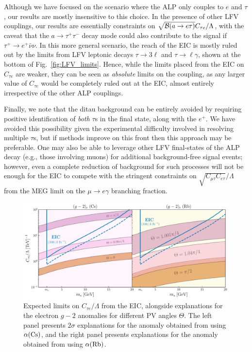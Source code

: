 Although we have focused on the scenario where the ALP only couples to $e$ and $\tau$, our results are mostly insensitive to this choice. In the presence of other LFV couplings, our results are essentially constraints on $\sqrt{{\cal B}(a\rightarrow e\tau)}C_{\tau e}/\Lambda$, with the caveat that the $a\rightarrow \tau^+\tau^-$ decay mode could also contribute to the signal if $\tau^+ \rightarrow e^+\bar{\nu}\nu$. In this more general scenario, the reach of the EIC is mostly ruled out by the limits from LFV leptonic decays $\tau \rightarrow 3\ell$ and $\tau \rightarrow \ell \gamma$, shown at the bottom of Fig.~\ref{fig:LFV_limits}. Hence, while the limits placed from the EIC on $C_{\tau e}$ are weaker, they can be seen as {\it absolute} limits on the coupling, as any larger value of $C_{\tau e}$ would be completely ruled out at the EIC, almost entirely irrespective of the other ALP couplings. 

Finally, we note that the ditau background can be entirely avoided by requiring positive identification of {\it both} $\tau$s in the final state, along with the $e^+$. We have avoided this possibility given the experimental difficulty involved in resolving multiple $\tau$s, but if methods improve on this front then this approach may be preferable. One may also be able to leverage other LFV final-states of the ALP decay (e.g., those involving muons) for additional background-free signal events; however, even a complete reduction of background for such processes will not be enough for the EIC to compete with the stringent constraints on $\sqrt{C_{\mu \tau}C_{e\tau}}/\Lambda$ from  the MEG limit on the $\mu\rightarrow e\gamma$ branching fraction.


\begin{figure}[t!]
    \centering
    \includegraphics[width=\linewidth]{figures/chapter5/EIC_ALP_electron_g_2.pdf}
    \caption[Projected constraints on LFV ALPs at the EIC, alongside explanations for the electron $g-2$ anomalies.]{Expected limits on $C_{\tau e}/\Lambda$ from the EIC, alongside explanations for the electron $g-2$ anomalies for different PV angles $\Theta$. The left panel presents $2\sigma$ explanations for the anomaly obtained from using $\alpha({\rm Cs})$, and the right panel presents explanations for the anomaly obtained from using $\alpha({\rm Rb})$.}
    \label{fig:EIC_g_2}
\end{figure}

